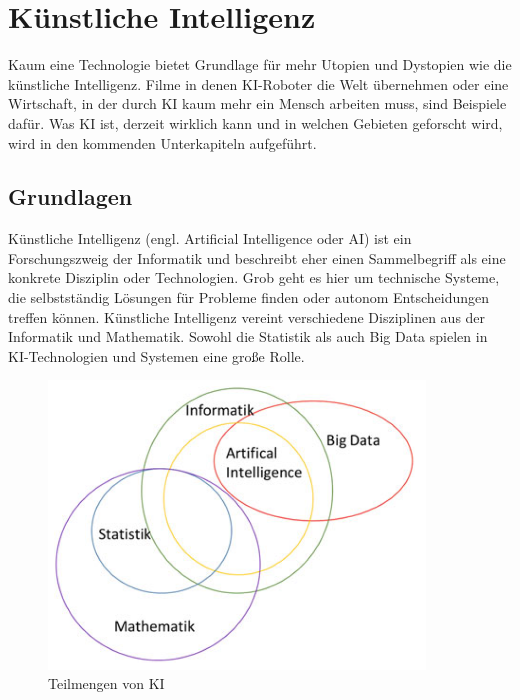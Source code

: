 \documentclass[a4paper,12pt, german]{report}
\begin{document}
\section{Künstliche Intelligenz}

Kaum eine Technologie bietet Grundlage für mehr Utopien und Dystopien wie die künstliche Intelligenz. Filme in denen KI-Roboter die Welt übernehmen oder eine Wirtschaft, in der durch KI kaum mehr ein Mensch arbeiten muss, sind Beispiele dafür. Was KI ist, derzeit wirklich kann und in welchen Gebieten geforscht wird, wird in den kommenden Unterkapiteln aufgeführt. 

\subsection{Grundlagen}

Künstliche Intelligenz (engl. Artificial Intelligence oder AI) ist ein Forschungszweig der Informatik und beschreibt eher einen Sammelbegriff als eine konkrete Disziplin oder Technologien. Grob geht es hier um technische Systeme, die selbstständig Lösungen für Probleme finden oder autonom Entscheidungen treffen können. \cite{01}\cite{10}\newline
Künstliche Intelligenz vereint verschiedene Disziplinen aus der Informatik und Mathematik. Sowohl die Statistik als auch Big Data spielen in KI-Technologien und Systemen eine große Rolle.\cite{17}

\begin{figure}[H]
  \center
 \includegraphics[width=10cm]{images/KI-Teilmengen.png}
  \caption[Teilmengen von KI]{Teilmengen von KI \cite{17}}
\end{figure}
\end{document}

